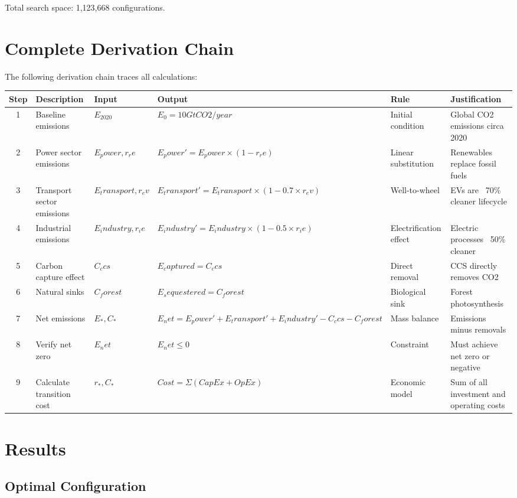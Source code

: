 \documentclass[11pt,a4paper]{article}
\begin{document}
Total search space: 1,123,668 configurations.

\section{Complete Derivation Chain}

The following derivation chain traces all calculations:

\begin{longtable}{|c|p{3cm}|p{2.5cm}|p{3cm}|p{2cm}|p{3cm}|}
\hline
Step & Description & Input & Output & Rule & Justification \\
\hline\endhead
1 & Baseline emissions & $E_2020$ & $E_0 = 10 GtCO2/year$ & Initial condition & Global CO2 emissions circa 2020 \\
\hline
2 & Power sector emissions & $E_power, r_re$ & $E_power' = E_power × (1 - r_re)$ & Linear substitution & Renewables replace fossil fuels \\
\hline
3 & Transport sector emissions & $E_transport, r_ev$ & $E_transport' = E_transport × (1 - 0.7 × r_ev)$ & Well-to-wheel & EVs are ~70\% cleaner lifecycle \\
\hline
4 & Industrial emissions & $E_industry, r_ie$ & $E_industry' = E_industry × (1 - 0.5 × r_ie)$ & Electrification effect & Electric processes ~50\% cleaner \\
\hline
5 & Carbon capture effect & $C_ccs$ & $E_captured = C_ccs$ & Direct removal & CCS directly removes CO2 \\
\hline
6 & Natural sinks & $C_forest$ & $E_sequestered = C_forest$ & Biological sink & Forest photosynthesis \\
\hline
7 & Net emissions & $E_*, C_*$ & $E_net = E_power' + E_transport' + E_industry' - C_ccs - C_forest$ & Mass balance & Emissions minus removals \\
\hline
8 & Verify net zero & $E_net$ & $E_net ≤ 0$ & Constraint & Must achieve net zero or negative \\
\hline
9 & Calculate transition cost & $r_*, C_*$ & $Cost = Σ(CapEx + OpEx)$ & Economic model & Sum of all investment and operating costs \\
\hline
\end{longtable}

\section{Results}

\subsection{Optimal Configuration}
\end{document}
